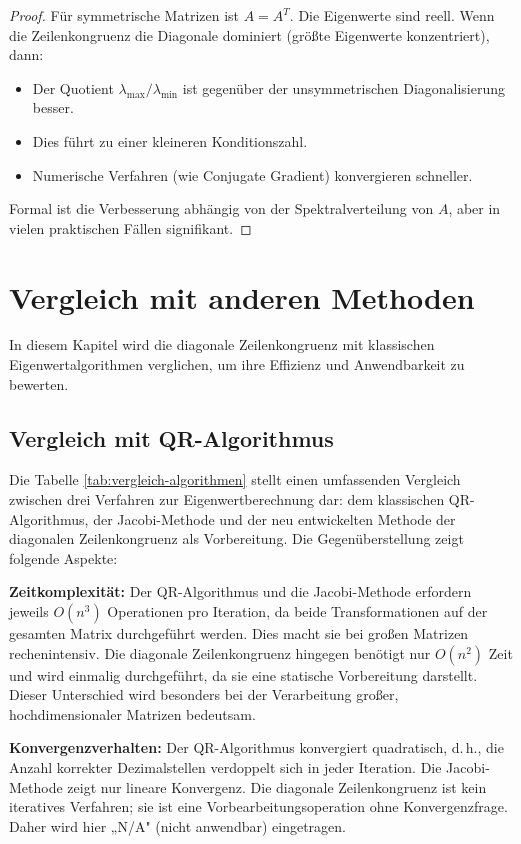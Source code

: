 \documentclass[a4paper,12pt]{article}
\theoremstyle{definition}
\begin{document}
\begin{proof}
	Für symmetrische Matrizen ist $A = A^T$. Die Eigenwerte sind reell. Wenn die Zeilenkongruenz die Diagonale dominiert (größte Eigenwerte konzentriert), dann:
	
	\begin{itemize}
		\item Der Quotient $\lambda_{\max} / \lambda_{\min}$ ist gegenüber der unsymmetrischen Diagonalisierung besser.
		\item Dies führt zu einer kleineren Konditionszahl.
		\item Numerische Verfahren (wie Conjugate Gradient) konvergieren schneller.
	\end{itemize}
	
	Formal ist die Verbesserung abhängig von der Spektralverteilung von $A$, aber in vielen praktischen Fällen signifikant.
\end{proof}

\section{Vergleich mit anderen Methoden}
 In diesem Kapitel wird die diagonale Zeilenkongruenz mit klassischen Eigenwertalgorithmen verglichen, um ihre Effizienz und Anwendbarkeit zu bewerten.

\subsection{Vergleich mit QR-Algorithmus}

Die Tabelle \ref{tab:vergleich-algorithmen} stellt einen umfassenden Vergleich zwischen drei Verfahren zur Eigenwertberechnung dar: dem klassischen QR-Algorithmus, der Jacobi-Methode und der neu entwickelten Methode der diagonalen Zeilenkongruenz als Vorbereitung. Die Gegenüberstellung zeigt folgende Aspekte:

\textbf{Zeitkomplexität:} Der QR-Algorithmus und die Jacobi-Methode erfordern jeweils $O(n^3)$ Operationen pro Iteration, da beide Transformationen auf der gesamten Matrix durchgeführt werden. Dies macht sie bei großen Matrizen rechenintensiv. Die diagonale Zeilenkongruenz hingegen benötigt nur $O(n^2)$ Zeit und wird einmalig durchgeführt, da sie eine statische Vorbereitung darstellt. Dieser Unterschied wird besonders bei der Verarbeitung großer, hochdimensionaler Matrizen bedeutsam.

\textbf{Konvergenzverhalten:} Der QR-Algorithmus konvergiert quadratisch, d.\,h., die Anzahl korrekter Dezimalstellen verdoppelt sich in jeder Iteration. Die Jacobi-Methode zeigt nur lineare Konvergenz. Die diagonale Zeilenkongruenz ist kein iteratives Verfahren; sie ist eine Vorbearbeitungsoperation ohne Konvergenzfrage. Daher wird hier „N/A" (nicht anwendbar) eingetragen.
\end{document}
